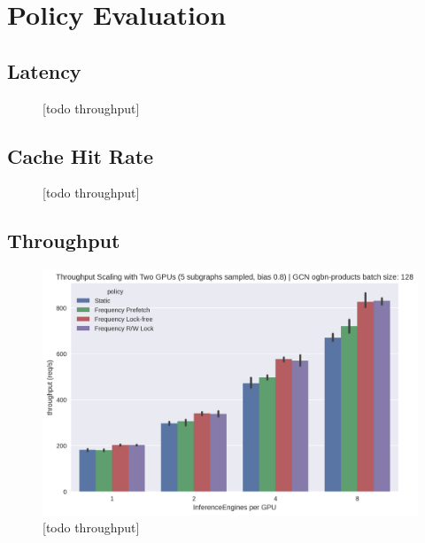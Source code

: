 \section{Policy Evaluation}

\subsection{Latency}
\begin{figure}[h!]
    \centering
    \caption{[todo throughput]}
    \label{Eval: Latency speedup}
\end{figure}    

\subsection{Cache Hit Rate}
\begin{figure}[h!]
    \centering
    \caption{[todo throughput]}
    \label{Eval: Hit Rate}
\end{figure}    

\subsection{Throughput}

\begin{figure}[h!]
    \centering
    \includegraphics[width=\textwidth]{figures/throughput_GCN_bias_0.8_pinnedc0.2_gpus_2.png}
    \caption{[todo throughput]}
    \label{Eval: Throughput}
\end{figure}    

